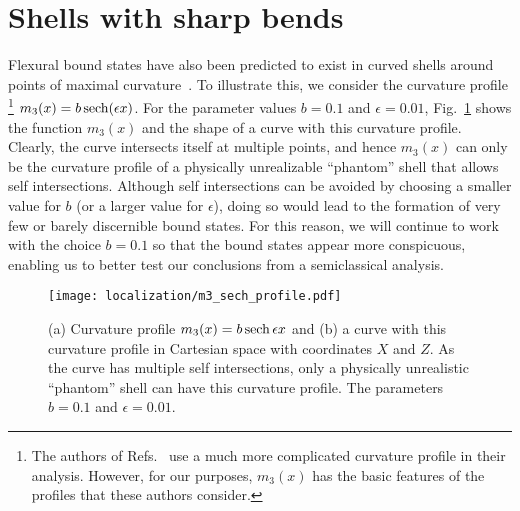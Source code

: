 %

\section{Shells with sharp bends}

Flexural bound states have also been predicted to exist in curved shells around points of maximal curvature~\cite{mohammed2021}.
To illustrate this, we consider the curvature profile%
\footnote{The authors of Refs.~\cite{sondergaard2002,mohammed2021} use a much more complicated curvature profile in their analysis.  However, for our purposes, $m_{3}(x)$ has the basic features of the profiles that these authors consider.}
$m_{3}(x) = b\operatorname{sech}(\epsilon x)$.
For the parameter values $b = 0.1$ and $\epsilon = 0.01$, Fig.~\ref{fig:shell_m3_profile} shows the function $m_{3}(x)$ and the shape of a curve with this curvature profile.
Clearly, the curve intersects itself at multiple points, and hence $m_{3}(x)$ can only be the curvature profile of a physically unrealizable ``phantom'' shell that allows self intersections.
Although self intersections can be avoided by choosing a smaller value for $b$ (or a larger value for $\epsilon$), doing so would lead to the formation of very few or barely discernible bound states.
For this reason, we will continue to work with the choice $b=0.1$ so that the bound states appear more conspicuous, enabling us to better test our conclusions from a semiclassical analysis.
%
\begin{figure}
  \begin{center}
    \texttt{[image: localization/m3\_sech\_profile.pdf]}
  \end{center}
  \caption{%
    (a) Curvature profile $m_{3}(x) = b\operatorname{sech}{\epsilon x}$ and (b) a curve with this curvature profile in Cartesian space with coordinates $X$ and $Z$.
    As the curve has multiple self intersections, only a physically unrealistic ``phantom'' shell can have this curvature profile.
    The parameters $b = 0.1$ and $\epsilon = 0.01$.
  }
  \label{fig:shell_m3_profile}
\end{figure}

